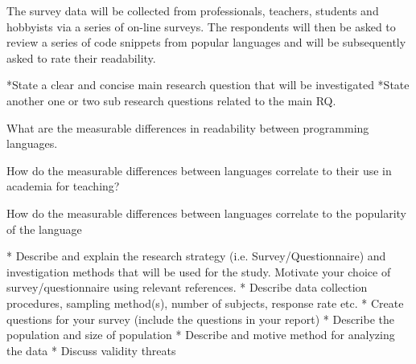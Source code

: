 \documentclass[times, 10pt,twocolumn]{IEEEtran}
\begin{document}
The survey data will be collected from professionals, teachers, students and hobbyists via a series of on-line surveys. The respondents will then be asked to review a series of code snippets from popular languages and will be subsequently asked to rate their readability. 
\newline

*State a clear and concise main  research  question  that  will  be  investigated
*State another one or  two sub research  questions related to  the main  RQ.

What are the measurable differences in readability between programming languages.

How do the measurable differences between languages correlate to their use in academia for teaching?

How do the measurable differences between languages correlate to the popularity of the language 

* Describe  and explain the research  strategy (i.e.  Survey/Questionnaire)
and investigation methods that  will  be  used  for the study.  Motivate  your  
choice  of  survey/questionnaire  using relevant  references.
* Describe  data  collection  procedures, sampling  method(s),  number  of  
subjects, response  rate  etc.
* Create  questions for your  survey  (include  the questions in  your  report)
* Describe  the population  and size  of  population
* Describe  and motive  method  for analyzing the data
* Discuss validity  threats





\end{document}

